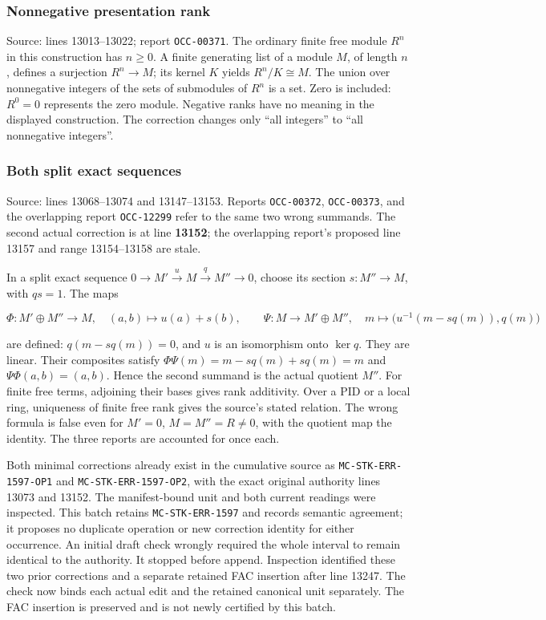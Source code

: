 \subsubsection{Nonnegative presentation rank}\label{algebra-proof-001-nonnegative-presentation-rank}

Source: lines 13013--13022; report \texttt{OCC-00371}. The ordinary finite free module \(R^n\) in this construction has \(n\geq0\). A finite generating list of a module \(M\), of length \(n\), defines a surjection \(R^n\to M\); its kernel \(K\) yields \(R^n/K\cong M\). The union over nonnegative integers of the sets of submodules of \(R^n\) is a set. Zero is included: \(R^0=0\) represents the zero module. Negative ranks have no meaning in the displayed construction. The correction changes only ``all integers'' to ``all nonnegative integers''.

\subsubsection{Both split exact sequences}\label{algebra-proof-001-both-split-exact-sequences}

Source: lines 13068--13074 and 13147--13153. Reports \texttt{OCC-00372}, \texttt{OCC-00373}, and the overlapping report \texttt{OCC-12299} refer to the same two wrong summands. The second actual correction is at line \textbf{13152}; the overlapping report's proposed line 13157 and range 13154--13158 are stale.

In a split exact sequence \(0\to M'\xrightarrow{u}M\xrightarrow{q}M''\to0\), choose its section \(s:M''\to M\), with \(qs=1\). The maps

\[
\Phi:M'\oplus M''\to M,\quad (a,b)\mapsto u(a)+s(b),
\qquad
\Psi:M\to M'\oplus M'',\quad
m\mapsto\bigl(u^{-1}(m-sq(m)),q(m)\bigr)
\]

are defined: \(q(m-sq(m))=0\), and \(u\) is an isomorphism onto \(\ker q\). They are linear. Their composites satisfy \(\Phi\Psi(m)=m-sq(m)+sq(m)=m\) and \(\Psi\Phi(a,b)=(a,b)\). Hence the second summand is the actual quotient \(M''\). For finite free terms, adjoining their bases gives rank additivity. Over a PID or a local ring, uniqueness of finite free rank gives the source's stated relation. The wrong formula is false even for \(M'=0\), \(M=M''=R\ne0\), with the quotient map the identity. The three reports are accounted for once each.

Both minimal corrections already exist in the cumulative source as \texttt{MC-STK-ERR-1597-OP1} and \texttt{MC-STK-ERR-1597-OP2}, with the exact original authority lines 13073 and 13152. The manifest-bound unit and both current readings were inspected. This batch retains \texttt{MC-STK-ERR-1597} and records semantic agreement; it proposes no duplicate operation or new correction identity for either occurrence. An initial draft check wrongly required the whole interval to remain identical to the authority. It stopped before append. Inspection identified these two prior corrections and a separate retained FAC insertion after line 13247. The check now binds each actual edit and the retained canonical unit separately. The FAC insertion is preserved and is not newly certified by this batch.

